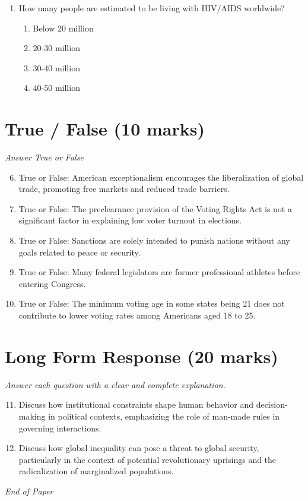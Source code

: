 \documentclass[12pt]{article}
\begin{document}
\begin{enumerate}[label=\arabic*.]
\begin{enumerate}[label=(\alph*)]
    \item They serve American interests
    \item The US is incapable of acting alone
    \item None of the above
\end{enumerate}
\item How many people are estimated to be living with HIV/AIDS worldwide?
\begin{enumerate}[label=(\alph*)]
    \item Below 20 million
    \item 20-30 million
    \item 30-40 million
    \item 40-50 million
\end{enumerate}
\end{enumerate}

\section*{True / False (10 marks)}
\textit{Answer True or False}
\begin{enumerate}[label=\arabic*.]
\setcounter{enumi}{5}
\item True or False: American exceptionalism encourages the liberalization of global trade, promoting free markets and reduced trade barriers.
\item True or False: The preclearance provision of the Voting Rights Act is not a significant factor in explaining low voter turnout in elections.
\item True or False: Sanctions are solely intended to punish nations without any goals related to peace or security.
\item True or False: Many federal legislators are former professional athletes before entering Congress.
\item True or False: The minimum voting age in some states being 21 does not contribute to lower voting rates among Americans aged 18 to 25.
\end{enumerate}

\section*{Long Form Response (20 marks)}
\textit{Answer each question with a clear and complete explanation.}
\begin{enumerate}[label=\arabic*.]
\setcounter{enumi}{10}
\item Discuss how institutional constraints shape human behavior and decision-making in political contexts, emphasizing the role of man-made rules in governing interactions.
\item Discuss how global inequality can pose a threat to global security, particularly in the context of potential revolutionary uprisings and the radicalization of marginalized populations.
\end{enumerate}

\vfill
\noindent\textit{End of Paper}
\end{document}
